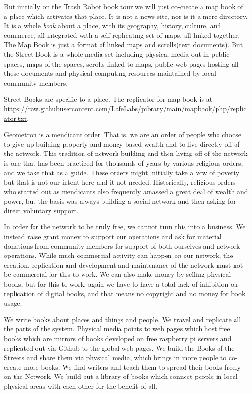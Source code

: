 But initially on the Trash Robot book tour we will just co-create a map
book of a place which activates that place. It is not a news site, nor
is it a mere directory. It is a whole \emph{book} about a place, with
its geography, history, culture, and commerce, all integrated with a
self-replicating set of maps, all linked together. The Map Book is just
a format of linked maps and scrolls(text documents). But the Street Book
is a whole media set including physical media out in public spaces, maps
of the spaces, scrolls linked to maps, public web pages hosting all
these documents and physical computing resources maintained by local
community members.

Street Books are specific to a place. The replicator for map book is at
\url{https://raw.githubusercontent.com/LafeLabs/pibrary/main/mapbook/php/replicator.txt}.

Geometron is a mendicant order. That is, we are an order of people who
choose to give up building property and money based wealth and to live
directly off of the network. This tradition of network building and then
living off of the network is one that has been practiced for thousands
of years by various religious orders, and we take that as a guide. These
orders might initially take a vow of poverty but that is not our intent
here and it not needed. Historically, religious orders who started out
as mendicants also frequently amassed a great deal of wealth and power,
but the basis was always building a social network and then asking for
direct voluntary support.

In order for the network to be truly free, we cannot turn this into a
business. We instead raise grant money to support our operations and ask
for material donations from community members for support of both
ourselves and network operations. While much commercial activity can
happen \emph{on} our network, the creation, replication and development
and maintenance of the network must not be commercial for this to work.
We can also make money by selling physical books, but for this to work,
again we have to have a total lack of inhibition on replication of
digital books, and that means no copyright and no money for book usage.

We write books about places and things and people. We travel and
replicate all the parts of the system. Physical media points to web
pages which host free books which are mirrors of books developed on free
raspberry pi servers and replicated out via Github to the global web
pages. We build the Books of the Streets and share them via physical
media, which brings in more people to co-create more books. We find
writers and teach them to spread their books freely on the Network. We
build out a library of books which connect people in local physical
areas with each other for the benefit of all.

